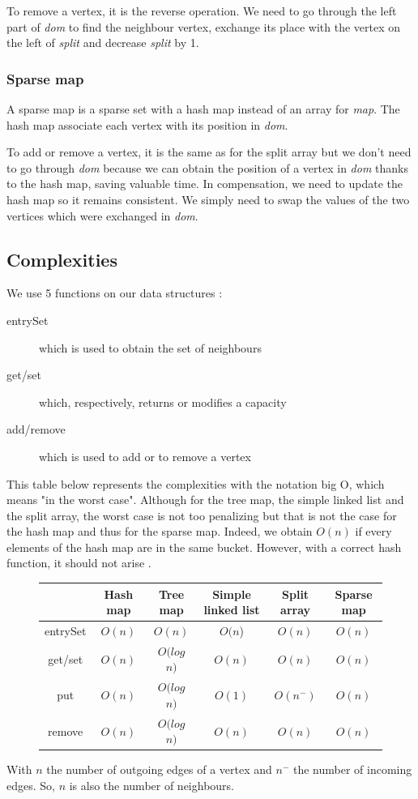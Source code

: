 To remove a vertex, it is the reverse operation. We need to go through the left part of \textit{dom} to find the neighbour vertex, exchange its place with the vertex on the left of \textit{split} and decrease \textit{split} by 1.
\subsubsection{Sparse map}
A sparse map is a sparse set with a hash map instead of an array for \textit{map}. The hash map associate each vertex with its position in \textit{dom}.

To add or remove a vertex, it is the same as for the split array but we don't need to go through \textit{dom} because we can obtain the position of a vertex in \textit{dom} thanks to the hash map, saving valuable time. In compensation, we need to update the hash map so it remains consistent. We simply need to swap the values of the two vertices which were exchanged in \textit{dom}.

\newpage

\subsection{Complexities}

We use 5 functions on our data structures :
\begin{description}
\item[entrySet] which is used to obtain the set of neighbours
\item[get/set] which, respectively, returns or modifies a capacity
\item[add/remove] which is used to add or to remove a vertex
\end{description}


This table below represents the complexities with the notation big O, which means "in the worst case". Although for the tree map, the simple linked list and the split array, the worst case is not too penalizing but that is not the case for the hash map and thus for the sparse map. Indeed, we obtain $O(n)$ if every elements of the hash map are in the same bucket. However, with a correct hash function, it should not arise \cite{datastructures}. \newline
\begin{figure}[H]
\centering
\begin{tabular}{|c|c|c|c|c|c|}
	\hline
     & \textbf{Hash map} & \textbf{Tree map} & \textbf{Simple linked list} & \textbf{Split array} & \textbf{Sparse map}\\
     \hline	
   entrySet & $O(n)$ & $O(n)$ & $O(n$) & $O(n)$ & $O(n)$ \\
   get/set & $O(n)$ & $O(log$ $n)$ & $O(n)$ & $O(n)$ & $O(n)$ \\
   put & $O(n)$ & $O(log$ $n)$ & $O(1)$ & $O(n^-)$ & $O(n)$ \\
   remove & $O(n)$ & $O(log$ $n)$ & $O(n)$ & $O(n)$ & $O(n)$ \\
   \hline
\end{tabular} 
\end{figure}

With $n$ the number of outgoing edges of a vertex and $n^-$ the number of incoming edges. So, $n$ is also the number of neighbours.